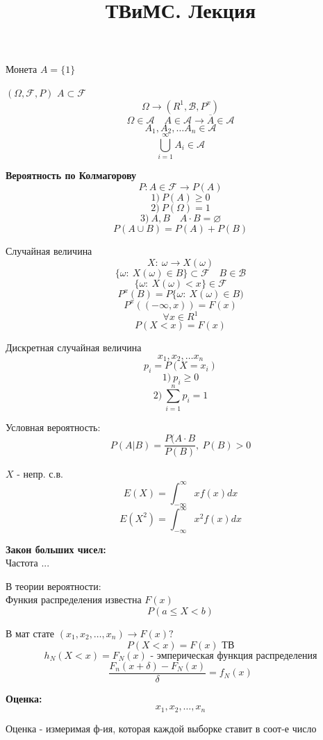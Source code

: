\documentclass[a4paper]{article}
\begin{document}
\title{ТВиМС. Лекция}
\maketitle

Монета $ A = \{ 1 \} $

$ (\Omega, \mathcal{F}, P) $ $ A \subset \mathcal{F} $  
\[
    \Omega \to (R^1, \mathcal{B}, P^x)
\]
\[
    \Omega \in \mathcal{A} \quad A \in \mathcal{A} \to \overline{A} \in \mathcal{A}
\]
\[
    A_1, A_2, \dots A_n \in \mathcal{A}
\]
\[
    \bigcup_{i=1}^{\infty} A_i \in \mathcal{A}
\]

\textbf{Вероятность по Колмагорову}
\[
    P: A \in \mathcal{F} \to P(A)  
\]
\[
    1) \ P(A) \geq 0
\]
\[
    2) \ P(\Omega) = 1
\]
\[
    3) \ A, B \quad A \cdot B = \varnothing
\]
\[
    P(A \cup B) = P(A) + P(B)
\]

Случайная величина
\[
    X: \ \omega \to X(\omega)
\]
\[
    \{ \omega: \ X(\omega) \in B \} \subset \mathcal{F} \quad B \in \mathcal{B}
\]
\[
    \{ \omega: \ X(\omega) < x \} \in \mathcal{F}
\]
\[
    P^x(B) = P\{ \omega: \ X(\omega) \in B)
\]
\[
    P^x( (-\infty, x)) = F(x)
\]
\[
    \forall x \in R^1
\]
\[
    P(X < x) = F(x)
\]

Дискретная случайная величина
\[
    x_1, x_2, \dots x_n
\]
\[
    p_i = P(X = x_i)
\]
\[
    1) \ p_i \geq 0
\]
\[
    2) \ \sum_{i=1}^{n} p_i = 1
\]

Условная вероятность:
\[
    P(A|B) = \frac{P(A \cdot B}{P(B)}, \ P(B) > 0 
\]

$ X $ - непр. с.в.
\[
    E(X) = \int_{-\infty}^{\infty} xf(x) dx
\]
\[
    E(X^2) = \int_{-\infty}^{\infty} x^2 f(x) dx
\]

\textbf{Закон больших чисел:}\\
Частота ...

В теории вероятности: \\
Функия распределения известна $ F(x) $ 
\[
    P(a \leq X < b)
\]

В мат стате $ (x_1, x_2, \dots, x_n) \to F(x)? $ 
\[
    P(X < x) = F(x) \text{ ТВ}
\]
\[
    h_N(X<x) = F_N(x) \text{ - эмперическая функция распределения}
\]
\[
    \frac{F_n(x + \delta) - F_N(x)}{\delta} = f_N(x)
\]

\textbf{Оценка:}
\[
    x_1, x_2, \dots, x_n
\]

Оценка - измеримая ф-ия, которая каждой выборке ставит в соот-е число
\end{document}
